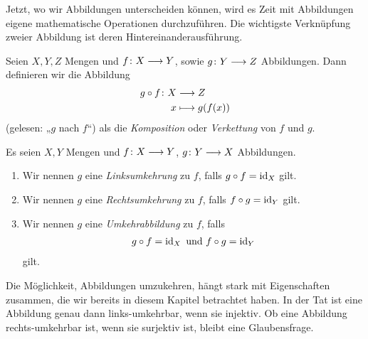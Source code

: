 
Jetzt, wo wir Abbildungen unterscheiden können, wird es Zeit mit Abbildungen
eigene mathematische Operationen durchzuführen. Die wichtigste Verknüpfung
zweier Abbildung ist deren Hintereinanderausführung.


\begin{defin}
  Seien $X,Y,Z$ Mengen und $f\colon X \longrightarrow Y$, sowie $g\colon Y \longrightarrow Z$
  Abbildungen. Dann definieren wir die Abbildung
  \begin{align*}
    g \circ f \colon X &\longrightarrow Z \\
    x &\longmapsto g(f(x))
  \end{align*}
  (gelesen: „$g$ nach $f$“) als die \emph{Komposition} oder
  \emph{Verkettung} von $f$ und $g$.
\end{defin}


\begin{defin}

  Es seien $X,Y$ Mengen und $f\colon X \longrightarrow Y$, $g\colon Y \longrightarrow X$
  Abbildungen.

  \begin{enumerate}
  \item Wir nennen $g$ eine \emph{Linksumkehrung} zu $f$, falls
    $g\circ f = \operatorname{id}_{X}$ gilt.
  \item Wir nennen $g$ eine \emph{Rechtsumkehrung} zu $f$, falls
    $f\circ g = \operatorname{id}_{Y}$ gilt.
  \item Wir nennen $g$ eine \emph{Umkehrabbildung} zu $f$, falls
    \begin{align*}
      g\circ f = \operatorname{id}_{X} \text{ und } f\circ g = \operatorname{id}_{Y}
    \end{align*}
    gilt.
  \end{enumerate}
  
\end{defin}

Die Möglichkeit, Abbildungen umzukehren, hängt stark mit Eigenschaften
zusammen, die wir bereits in diesem Kapitel betrachtet haben. In der Tat
ist eine Abbildung genau dann links-umkehrbar, wenn sie injektiv. Ob eine
Abbildung rechts-umkehrbar ist, wenn sie surjektiv ist, bleibt eine
Glaubensfrage.


